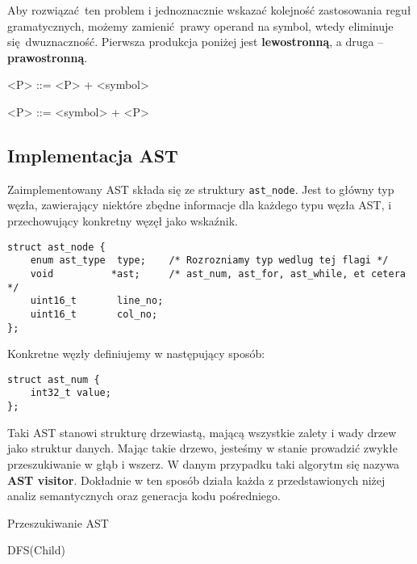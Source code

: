 \documentclass[leqno, 12pt]{article}
\newcommand{\spacing}{\vskip 0.5cm}
\begin{document}
			Aby rozwiązać ten problem i jednoznacznie wskazać kolejność zastosowania reguł gramatycznych,
			możemy zamienić prawy operand na symbol, wtedy eliminuje się dwuznaczność. Pierwsza produkcja
			poniżej jest \textbf{lewostronną}, a druga -- \textbf{prawostronną}.

			\begin{grammar}
		        <P> ::= <P> + <symbol>
	
		        <P> ::= <symbol> + <P>
			\end{grammar}

			\newpage

		\subsection{Implementacja AST}

			Zaimplementowany AST składa się ze struktury \texttt{ast_node}. Jest to główny typ
			węzła, zawierający niektóre zbędne informacje dla każdego typu węzła AST, i przechowujący
			konkretny węzęł jako wskaźnik.

			\spacing

			\begin{lstlisting}[label={lst:ast-node}]
struct ast_node {
    enum ast_type  type;    /* Rozrozniamy typ wedlug tej flagi */
    void          *ast;     /* ast_num, ast_for, ast_while, et cetera */
    uint16_t       line_no;
    uint16_t       col_no;
};
			\end{lstlisting}
			
			\spacing
			
			Konkretne węzły definiujemy w następujący sposób:

			\spacing

			\begin{lstlisting}[label={lst:ast-concrete-node}]
struct ast_num {
    int32_t value;
};
			\end{lstlisting}
			
			\spacing
			
			Taki AST stanowi strukturę drzewiastą, mającą wszystkie zalety i wady drzew jako struktur
			danych. Mając takie drzewo, jesteśmy w stanie prowadzić zwykłe przeszukiwanie w głąb
			i wszerz. W danym przypadku taki algorytm się nazywa \textbf{AST visitor}. Dokładnie w ten
			sposób działa każda z przedstawionych niżej analiz semantycznych
			oraz generacja kodu pośredniego.

			\spacing

			\begin{algorithm}
				\caption{Przeszukiwanie AST}
				\begin{algorithmic}[1]

						\State DFS(Child)
					\EndFor
				\EndProcedure

				\end{algorithmic}
			\end{algorithm}
\end{document}
